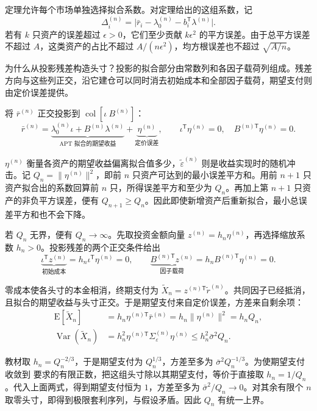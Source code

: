 定理允许每个市场单独选择拟合系数。对定理给出的这组系数，记
\[
 \Delta_i^{(n)}=\bigl|\bar r_i-\lambda_0^{(n)}-b_i^{\mathsf T}\lambda^{(n)}\bigr|.
\]
若有 $k$ 只资产的误差超过 $\epsilon>0$，它们至少贡献 $k\epsilon^2$ 的平方误差。由于总平方误差不超过 $A$，这类资产的占比不超过 $A/(n\epsilon^2)$，均方根误差也不超过 $\sqrt{A/n}$。

为什么从投影残差构造头寸？投影的拟合部分由常数列和各因子载荷列组成。残差方向与这些列正交，沿它建仓可以同时消去初始成本和全部因子载荷，期望支付则由定价误差提供。

\begin{solution}[label-content={证明},blank-type=none]
将 $\bar r^{(n)}$ 正交投影到 $\operatorname{col}[\iota\ B^{(n)}]$：
\[
 \bar r^{(n)}
 =\underbrace{\lambda_0^{(n)}\iota+B^{(n)}\lambda^{(n)}}_{\text{APT 拟合的期望收益}}
 +\underbrace{\eta^{(n)}}_{\text{定价误差}},
 \qquad \iota^{\mathsf T}\eta^{(n)}=0,\quad B^{(n)\mathsf T}\eta^{(n)}=0.
\]

$\eta^{(n)}$ 衡量各资产的期望收益偏离拟合值多少，$\widetilde\varepsilon^{(n)}$ 则是收益实现时的随机冲击。记 $Q_n=\|\eta^{(n)}\|^2$，即前 $n$ 只资产可达到的最小误差平方和。用前 $n+1$ 只资产拟合出的系数回算前 $n$ 只，所得误差平方和至少为 $Q_n$。再加上第 $n+1$ 只资产的非负平方误差，便有 $Q_{n+1}\ge Q_n$。因此即使新增资产后重新拟合，最小总误差平方和也不会下降。

若 $Q_n$ 无界，便有 $Q_n\to\infty$。先取投资金额向量 $z^{(n)}=h_n\eta^{(n)}$，再选择缩放系数 $h_n>0$。投影残差的两个正交条件给出
\[
 \underbrace{\iota^{\mathsf T}z^{(n)}}_{\text{初始成本}}
 =h_n\iota^{\mathsf T}\eta^{(n)}=0,\qquad
 \underbrace{B^{(n)\mathsf T}z^{(n)}}_{\text{因子载荷}}
 =h_n B^{(n)\mathsf T}\eta^{(n)}=0.
\]

零成本使各头寸的本金相消，终期支付为 $\widetilde X_n=z^{(n)\mathsf T}\widetilde r^{(n)}$。共同因子已经抵消，且拟合的期望收益与头寸正交。于是期望支付来自定价误差，方差来自剩余项：
\begin{align*}
 \mathrm E[\widetilde X_n]
 &=h_n\eta^{(n)\mathsf T}\bar r^{(n)}
 =h_n\|\eta^{(n)}\|^2=h_n Q_n,\\
 \operatorname{Var}(\widetilde X_n)
 &=h_n^2\eta^{(n)\mathsf T}\Sigma_\varepsilon^{(n)}\eta^{(n)}
 \le h_n^2\bar\sigma^2 Q_n.
\end{align*}

教材取 $h_n=Q_n^{-2/3}$，于是期望支付为 $Q_n^{1/3}$，方差至多为 $\bar\sigma^2Q_n^{-1/3}$。为使期望支付收敛到 要求的有限正数，把这组头寸除以其期望支付，等价于直接取 $h_n=1/Q_n$。代入上面两式，得到期望支付恒为 $1$，方差至多为 $\bar\sigma^2/Q_n\to0$。对其余有限个 $n$ 取零头寸，即得到极限套利序列，与假设矛盾。因此 $Q_n$ 有统一上界。
\end{solution}

